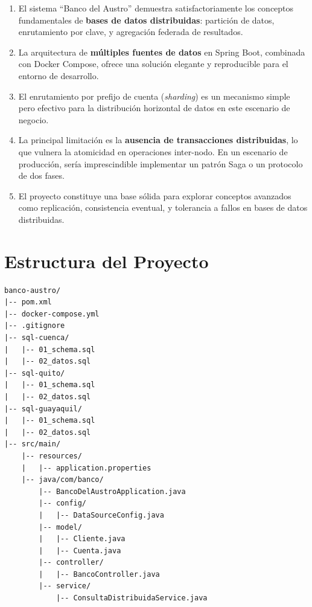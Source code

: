 \documentclass[12pt, a4paper]{article}
\begin{document}
\begin{enumerate}
  \item El sistema ``Banco del Austro'' demuestra satisfactoriamente los conceptos fundamentales de \textbf{bases de datos distribuidas}: partición de datos, enrutamiento por clave, y agregación federada de resultados.

  \item La arquitectura de \textbf{múltiples fuentes de datos} en Spring Boot, combinada con Docker Compose, ofrece una solución elegante y reproducible para el entorno de desarrollo.

  \item El enrutamiento por prefijo de cuenta (\textit{sharding}) es un mecanismo simple pero efectivo para la distribución horizontal de datos en este escenario de negocio.

  \item La principal limitación es la \textbf{ausencia de transacciones distribuidas}, lo que vulnera la atomicidad en operaciones inter-nodo. En un escenario de producción, sería imprescindible implementar un patrón Saga o un protocolo de dos fases.

  \item El proyecto constituye una base sólida para explorar conceptos avanzados como replicación, consistencia eventual, y tolerancia a fallos en bases de datos distribuidas.
\end{enumerate}

\section{Estructura del Proyecto}

\begin{lstlisting}[caption={Estructura de directorios del proyecto}, language={}, frame=none, numbers=none]
banco-austro/
|-- pom.xml
|-- docker-compose.yml
|-- .gitignore
|-- sql-cuenca/
|   |-- 01_schema.sql
|   |-- 02_datos.sql
|-- sql-quito/
|   |-- 01_schema.sql
|   |-- 02_datos.sql
|-- sql-guayaquil/
|   |-- 01_schema.sql
|   |-- 02_datos.sql
|-- src/main/
    |-- resources/
    |   |-- application.properties
    |-- java/com/banco/
        |-- BancoDelAustroApplication.java
        |-- config/
        |   |-- DataSourceConfig.java
        |-- model/
        |   |-- Cliente.java
        |   |-- Cuenta.java
        |-- controller/
        |   |-- BancoController.java
        |-- service/
            |-- ConsultaDistribuidaService.java

\end{lstlisting}
\end{document}
